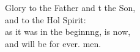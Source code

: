 \begin{psalmverse}
\begin{patverse}
Glory to the Father and t the Son,\Med\\
    and to the Hol Spirit:\\
as it was in the beginn\pointup{\i}ng, is now,\Med\\
    and will be for ever. men.
  \end{patverse}
  \end{psalmverse}
